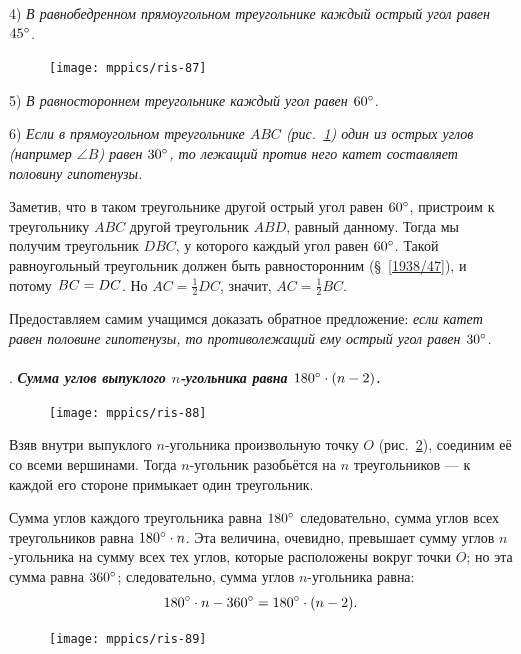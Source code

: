 \documentclass[twoside]{book}
\begin{document}
4) \emph{В равнобедренном прямоугольном треугольнике каждый острый угол равен $45\degree$.}

\begin{figure}
\centering
\texttt{[image: mppics/ris-87]}
\caption{}\label{1938/ris-87}
\end{figure}

5) \emph{В равностороннем треугольнике каждый угол равен $60\degree$.}

6) \emph{Если в прямоугольном треугольнике $ABC$ \emph{(рис.~\ref{1938/ris-87})} один из острых углов \emph{(например $\angle B$)} равен $30\degree$, то лежащий против него катет составляет половину гипотенузы.}

Заметив, что в таком треугольнике другой острый угол равен $60\degree$, пристроим к треугольнику $ABC$ другой треугольник $ABD$, равный данному.
Тогда мы получим треугольник $DBC$, у которого каждый угол равен $60\degree$.
Такой равноугольный треугольник должен быть равносторонним (§~\ref{1938/47}), и потому $BC\z=DC$.
Но $AC=\tfrac12DC$, значит, $AC=\tfrac12BC$.

Предоставляем самим учащимся доказать обратное предложение:
\emph{если катет равен половине гипотенузы, то противолежащий ему острый угол равен $30\degree$.}

\paragraph{}\label{1938/82}
.
\textbf{\emph{Сумма углов выпуклого $n$-угольника равна $180\degree\cdot(n-2)$.}}

\begin{figure}
\centering
\texttt{[image: mppics/ris-88]}
\caption{}\label{1938/ris-88}
\end{figure}

Взяв внутри выпуклого $n$-угольника произвольную точку $O$ (рис.~\ref{1938/ris-88}), соединим её со всеми вершинами.
Тогда $n$-угольник разобьётся на $n$ треугольников — к каждой его стороне примыкает один треугольник.

Сумма углов каждого треугольника равна $180\degree$ следовательно, сумма углов всех треугольников равна $180\degree\cdot n$.
Эта величина, очевидно, превышает сумму углов $n$-угольника на сумму всех тех углов, которые расположены вокруг точки $O$;
но эта сумма равна $360\degree$;
следовательно, сумма углов $n$-угольника равна:
\[180\degree\cdot n -360\degree = 180\degree\cdot(n - 2).\]

\begin{figure}
\centering
\texttt{[image: mppics/ris-89]}
\caption{}\label{1938/ris-89}
\end{figure}
\end{document}
